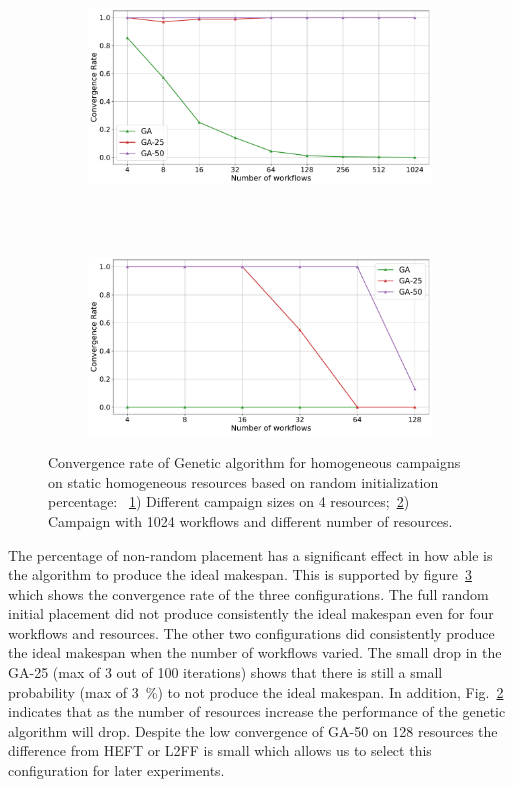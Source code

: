\begin{figure}[ht!]
    \centering
    \begin{subfigure}[b]{0.85\textwidth}
        \includegraphics[width=.95\textwidth]{figures/campaign/StHomoCampaigns_4StHomoResourcesGAconv.pdf}
        \caption{}
        \label{fig:ga_conv1}
    \end{subfigure}\\
    ~ 
    \begin{subfigure}[b]{0.85\textwidth}
        \includegraphics[width=.95\textwidth]{figures/campaign/HomogeResources_StHomogeCampaignsGAconv.pdf}
        \caption{}
        \label{fig:ga_conv2}
    \end{subfigure}
    \caption{Convergence rate of Genetic algorithm for homogeneous campaigns on static homogeneous resources based on random initialization percentage: ~\ref{fig:ga_conv1}) Different campaign sizes on 4 resources;~\ref{fig:ga_conv2}) Campaign with 1024 workflows and different number of resources.}
    \label{fig:conv_rate}
\end{figure}

The percentage of non-random placement has a significant effect in how able is the algorithm to produce the ideal makespan.
This is supported by figure~\ref{fig:conv_rate} which shows the convergence rate of the three configurations.
The full random initial placement did not produce consistently the ideal makespan even for four workflows and resources.
The other two configurations did consistently produce the ideal makespan when the number of workflows varied.
The small drop in the GA-25 (max of 3 out of 100 iterations) shows that there is still a small probability (max of 3~\%) to not produce the ideal makespan.
In addition, Fig.~\ref{fig:ga_conv2} indicates that as the number of resources increase the performance of the genetic algorithm will drop.
Despite the low convergence of GA-50 on 128 resources the difference from HEFT or L2FF is small which allows us to select this configuration for later experiments.

